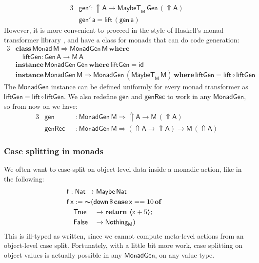 \documentclass[acmsmall,screen,review,anonymous]{acmart}
\newcommand{\mit}[1]{{\mathsf{#1}}}
\newcommand{\msf}[1]{{\mathsf{#1}}}
\newcommand{\mbf}[1]{{\mathbf{#1}}}
\newcommand{\bs}[1]{\boldsymbol{#1}}
\newcommand{\ind}{\hspace{1em}}
\newcommand{\return}{\mbf{return}\,}
\newcommand{\where}{\mbf{where}}
\newcommand{\M}{\msf{M}}
\newcommand{\of}{\mbf{of}\,}
\newcommand{\vA}{\mathsf{A}}
\newcommand{\vM}{\mathsf{M}}
\newcommand{\va}{\mathsf{a}}
\newcommand{\vx}{\mathsf{x}}
\newcommand{\vf}{\mathsf{f}}
\newcommand{\Monad}{\msf{Monad}}
\newcommand{\case}{\mbf{case\,}}
\newcommand{\Up}{{\Uparrow}}
\newcommand{\spl}{{\bs{\sim}}}
\newcommand{\ql}{{\bs{\langle}}}
\newcommand{\qr}{{\bs{\rangle}}}
\newcommand{\True}{\msf{True}}
\newcommand{\False}{\msf{False}}
\newcommand{\Nat}{\msf{Nat}}
\newcommand{\Maybe}{\msf{Maybe}}
\newcommand{\MaybeT}{\msf{MaybeT}}
\newcommand{\Nothing}{\msf{Nothing}}
\theoremstyle{remark}
\newcommand{\id}{\mit{id}}
\newcommand{\mdown}{\mit{down}}
\newcommand{\tyclass}{\mbf{class}}
\newcommand{\instance}{\mbf{instance}\,}
\newcommand{\Gen}{\msf{Gen}}
\newcommand{\gen}{\mit{gen}}
\newcommand{\genRec}{\mit{genRec}}
\newcommand{\qt}[1]{\ql#1\qr}
\newcommand{\lift}{\mit{lift}}
\newcommand{\liftGen}{\mit{liftGen}}
\newcommand{\MonadGen}{\msf{MonadGen}}
\newcommand{\RA}{\Rightarrow}
\begin{document}
\begin{alignat*}{3}
  &\gen' : \Up \vA \to \MaybeT_\M\,\Gen\,(\Up \vA) \\
  &\gen'\,\va = \lift\,(\gen\,\va)
\end{alignat*}
However, it is more convenient to proceed in the style of Haskell's monad
transformer library \cite{TODO}, and have a class for monads that can do code
generation:
\begin{alignat*}{3}
&\tyclass\,\Monad\,\vM \RA \MonadGen\,\vM\,\where\\
&\ind \liftGen : \Gen\,\vA \to \M\,\vA\\
&\instance \MonadGen\,\Gen\,\where\,\liftGen = \id \\
&\instance \MonadGen\,\vM \RA \MonadGen\,(\MaybeT_\M\,\vM)\,\where\,\liftGen = \lift \circ \liftGen
\end{alignat*}
The $\MonadGen$ instance can be defined uniformly for every monad transformer as
$\liftGen = \lift \circ \liftGen$. We also redefine $\gen$ and $\genRec$ to work
in any $\MonadGen$, so from now on we have:
\begin{alignat*}{3}
 &\gen   &&: \MonadGen\,\vM \RA \Up \vA \to \vM\,(\Up \vA)\\
 &\genRec &&: \MonadGen\,\vM \RA (\Up \vA \to \Up \vA) \to \vM\,(\Up \vA)
\end{alignat*}

\subsubsection{Case splitting in monads}
We often want to case-split on object-level data inside a monadic action, like
in the following:
\begin{alignat*}{3}
  & \hspace{-4em}\mathrlap{\vf : \Nat \to \Maybe\,\Nat}\\
  & \hspace{-4em}\mathrlap{\vf\,\vx := \spl(\mdown\,\$\, \case \vx == 10\,\of}\\
  & \hspace{-4em}\ind \True  &&\to \return\,\qt{\vx + 5};\\
  & \hspace{-4em}\ind \False &&\to \Nothing_\M)
\end{alignat*}
This is ill-typed as written, since we cannot compute meta-level actions from an
object-level case split. Fortunately, with a little bit more work, case
splitting on object values is actually possible in any $\MonadGen$, on any value
type.
\end{document}
